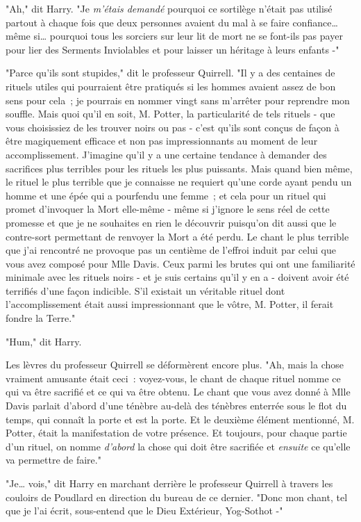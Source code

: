 "Ah," dit Harry. "Je \emph{m'étais demandé} pourquoi ce sortilège n'était pas utilisé partout à chaque fois que deux personnes avaient du mal à se faire confiance… même si… pourquoi tous les sorciers sur leur lit de mort ne se font-ils pas payer pour lier des Serments Inviolables et pour laisser un héritage à leurs enfants -"

"Parce qu'ils sont stupides," dit le professeur Quirrell. "Il y a des centaines de rituels utiles qui pourraient être pratiqués si les hommes avaient assez de bon sens pour cela~; je pourrais en nommer vingt sans m'arrêter pour reprendre mon souffle. Mais quoi qu'il en soit, M. Potter, la particularité de tels rituels - que vous choisissiez de les trouver noirs ou pas - c'est qu'ils sont conçus de façon à être magiquement efficace et non pas impressionnants au moment de leur accomplissement. J'imagine qu'il y a une certaine tendance à demander des sacrifices plus terribles pour les rituels les plus puissants. Mais quand bien même, le rituel le plus terrible que je connaisse ne requiert qu'une corde ayant pendu un homme et une épée qui a pourfendu une femme~; et cela pour un rituel qui promet d'invoquer la Mort elle-même - même si j'ignore le sens réel de cette promesse et que je ne souhaites en rien le découvrir puisqu'on dit aussi que le contre-sort permettant de renvoyer la Mort a été perdu. Le chant le plus terrible que j'ai rencontré ne provoque pas un centième de l'effroi induit par celui que vous avez composé pour Mlle Davis. Ceux parmi les brutes qui ont une familiarité minimale avec les rituels noirs - et je suis certains qu'il y en a - doivent avoir été terrifiés d'une façon indicible. S'il existait un véritable rituel dont l'accomplissement était aussi impressionnant que le vôtre, M. Potter, il ferait fondre la Terre."

"Hum," dit Harry.

Les lèvres du professeur Quirrell se déformèrent encore plus. "Ah, mais la chose vraiment amusante était ceci~: voyez-vous, le chant de chaque rituel nomme ce qui va être sacrifié et ce qui va être obtenu. Le chant que vous avez donné à Mlle Davis parlait d'abord d'une ténèbre au-delà des ténèbres enterrée sous le flot du temps, qui connaît la porte et est la porte. Et le deuxième élément mentionné, M. Potter, était la manifestation de votre présence. Et toujours, pour chaque partie d'un rituel, on nomme \emph{d'abord} la chose qui doit être sacrifiée et \emph{ensuite} ce qu'elle va permettre de faire."

"Je… vois," dit Harry en marchant derrière le professeur Quirrell à travers les couloirs de Poudlard en direction du bureau de ce dernier. "Donc mon chant, tel que je l'ai écrit, sous-entend que le Dieu Extérieur, Yog-Sothot -"

